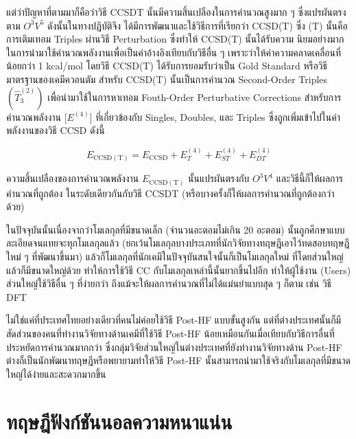 \noindent แต่ว่าปัญหาที่ตามมาก็คือว่าวิธี CCSDT นั้นมีความสิ้นเปลืองในการคำนวณสูงมาก ๆ ซึ่งแปรผันตรงตาม $O^3V^5$ ดังนั้นในทางปฏิบัติจึง%
ได้มีการพัฒนาและใช้วิธีการที่เรียกว่า CCSD(T) ซึ่ง (T) นั้นคือการเติมเทอม Triples ผ่านวิธี Perturbation ซึ่งทำให้ CCSD(T) นั้นได้รับความ%
นิยมอย่างมากในการนำมาใช้คำนวณพลังงานเพื่อเป็นค่าอ้างอิงเทียบกับวิธีอื่น ๆ เพราะว่าให้ค่าความคลาดเคลื่อนที่น้อยกว่า 1 kcal/mol โดยวิธี
CCSD(T) ได้รับการยอมรับว่าเป็น Gold Standard หรือวิธีมาตรฐานของเคมีควอนตัม สำหรับ CCSD(T) นั้นเป็นการคำนวณ Second-Order
Triples $(\hat{T}_3^{(2)})$ เพื่อนำมาใช้ในการหาเทอม Fouth-Order Perturbative Corrections สำหรับการคำนวณพลังงาน
[$E^{(4)}$] ที่เกี่ยวข้องกับ Singles, Doubles, และ Triples ซึ่งถูกเพิ่มเข้าไปในค่าพลังงานของวิธี CCSD ดังนี้

\begin{equation}
  E_{\mathrm{CCSD(T)}}
  =
  E_{\mathrm{CCSD}} + E_{T}^{(4)} + E_{ST}^{(4)} + E_{DT}^{(4)}
\end{equation}

\noindent ความสิ้นเปลืองของการคำนวณพลังงาน $E_{\mathrm{CCSD(T)}}$ นั้นแปรผันตรงกับ $O^3V^4$ และวิธีนี้ก็ให้ผลการคำนวณที่ถูกต้อง%
ในระดับเดียวกันกับวิธี CCSDT (หรือบางครั้งก็ให้ผลการคำนวณที่ถูกต้องกว่าด้วย)

ในปัจจุบันนั้นเนื่องจากว่าโมเลกุลที่มีขนาดเล็ก (จำนวนอะตอมไม่เกิน 20 อะตอม) นั้นถูกศึกษาแบบละเอียดจนแทยจะทุกโมเลกุลแล้ว
(ยกเว้นโมเลกุลบางประเภทที่นักวิจัยทางทฤษฎีเอาไว้ทดสอบทฤษฎีใหม่ ๆ ที่พัฒนาขึ้นมา) แล้วก็โมเลกุลที่นักเคมีในปัจจุบันสนใจนั้นก็เป็นโมเลกุลใหม่%
ที่โดยส่วนใหญ่แล้วก็มีขนาดใหญ่ด้วย ทำให้การใช้วิธี CC กับโมเลกุลเหล่านี้นั้นยากขึ้นไปอีก ทำให้ผู้ใช้งาน (Users) ส่วนใหญ่ใช้วิธีอื่น ๆ ที่ง่ายกว่า
ถึงแม้จะให้ผลการคำนวณที่ไม่ได้แม่นยำแบบสุด ๆ ก็ตาม เช่น วิธี DFT

ไม่ใช่แค่ที่ประเทศไทยอย่างเดียวที่คนไม่ค่อยใช้วิธี Post-HF แบบขั้นสูงกัน แต่ที่ต่างประเทศนั้นก็มีสัดส่วนของคนที่ทำงานวิจัยทางด้านเคมีที่ใช้วิธี
Post-HF น้อยเหมือนกันเมื่อเทียบกับวิธีการอื่นที่ประหยัดการคำนวณมากกว่า ซึ่งกลุ่มวิจัยส่วนใหญ่ในต่างประเทศที่ยังทำงานวิจัยทางด้าน Post-HF
ต่างก็เป็นนักพัฒนาทฤษฎีหรือพยายามทำให้วิธี Post-HF นั้นสามารถนำมาใช้จริงกับโมเลกุลที่มีขนาดใหญ่ได้ง่ายและสะดวกมากขึ้น

\section{ทฤษฎีฟังก์ชันนอลความหนาแน่น}

